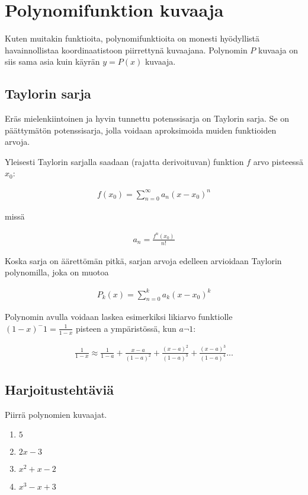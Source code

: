 \chapter{Polynomifunktion kuvaaja}
Kuten muitakin funktioita, polynomifunktioita on monesti hyödyllistä
havainnollistaa koordinaatistoon piirrettynä kuvaajana. Polynomin
$P$ kuvaaja on siis sama asia kuin käyrän $y = P(x)$ kuvaaja.

\begin{kuvaajapohja}{1.5}{-2}{2}{-3}{3}
\end{kuvaajapohja}

\section{Taylorin sarja}
Eräs mielenkiintoinen ja hyvin tunnettu potenssisarja on Taylorin sarja.
Se on päättymätön potenssisarja, jolla voidaan aproksimoida muiden funktioiden arvoja.

Yleisesti Taylorin sarjalla saadaan (rajatta derivoituvan) funktion $f$ arvo pisteessä $x_0$:

\begin{align*}
	f(x_0) = \sum\limits_{n=0}^\infty a_n(x-x_0)^n
\end{align*}

missä

\begin{align*}
a_n = \frac{f^n(x_0)}{n!}
\end{align*}

Koska sarja on äärettömän pitkä, sarjan arvoja edelleen arvioidaan Taylorin polynomilla, joka on muotoa

\begin{align*}
	P_k(x) = \sum\limits_{n=0}^k a_k(x-x_0)^k
\end{align*}

Polynomin avulla voidaan laskea esimerkiksi likiarvo funktiolle
$(1-x)^-1 = \frac{1}{1-x}$ pisteen a ympäristössä, kun $a \neg 1$:

\begin{align*}
	\frac{1}{1-x} \approx \frac{1}{1-a} + \frac{x-a}{(1-a)^2} + \frac{(x-a)^2}{(1-a)^3} + \frac{(x-a)^3}{(1-a)^4} ...
\end{align*}


\section{Harjoitustehtäviä}
\begin{tehtava}
	Piirrä polynomien kuvaajat.
	\begin{enumerate}
		\item $5$
		\item $2x-3$
		\item $x^2+x-2$
		\item $x^3-x+3$
	\end{enumerate}

	\begin{vastaus}
	\end{vastaus}
\end{tehtava}